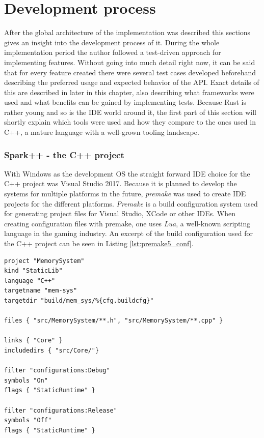 \section{Development process}

After the global architecture of the implementation was described this sections gives an insight into the development process of it. During the whole implementation period the author followed a test-driven approach for implementing features. Without going into much detail right now, it can be said that for every feature created there were several test cases developed beforehand describing the preferred usage and expected behavior of the \ac{API}. Exact details of this are described in later in this chapter, also describing what frameworks were used and what benefits can be gained by implementing tests. Because Rust is rather young and so is the \ac{IDE} world around it, the first part of this section will shortly explain which tools were used and how they compare to the ones used in C++, a mature language with a well-grown tooling landscape.

\subsubsection{Spark++ - the C++ project}

With Windows as the development \ac{OS} the straight forward \ac{IDE} choice for the C++ project was Visual Studio 2017. Because it is planned to develop the systems for multiple platforms in the future, \textit{premake} was used to create \ac{IDE} projects for the different platforms. \textit{Premake} is a build configuration system used for generating project files for Visual Studio, XCode or other \acp{IDE}. When creating configuration files with premake, one uses \textit{Lua}, a well-known scripting language in the gaming industry. An excerpt of the build configuration used for the C++ project can be seen in Listing \ref{lst:premake5_conf}.\\

\begin{lstlisting}[caption={Part of the premake.lua file used to generate the Spark C++ project files}, label={lst:premake5_conf}, language={[5.0]Lua}, numbers=none]
project "MemorySystem"
kind "StaticLib"
language "C++"
targetname "mem-sys"
targetdir "build/mem_sys/%{cfg.buildcfg}"

files { "src/MemorySystem/**.h", "src/MemorySystem/**.cpp" }

links { "Core" }
includedirs { "src/Core/"}

filter "configurations:Debug"
symbols "On"
flags { "StaticRuntime" }

filter "configurations:Release"
symbols "Off"
flags { "StaticRuntime" }
\end{lstlisting}

